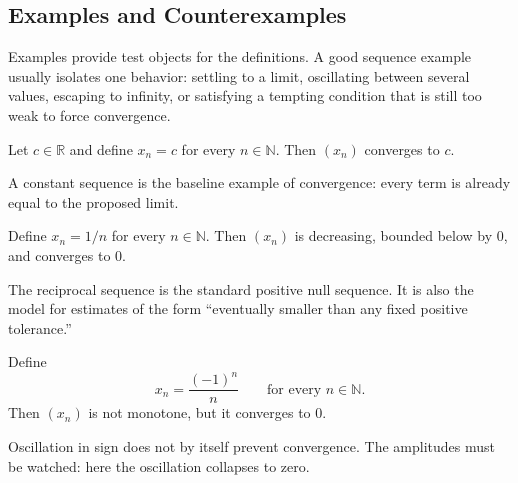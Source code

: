 \subsection*{Examples and Counterexamples}
\begin{exposition}
Examples provide test objects for the definitions. A good sequence example
usually isolates one behavior: settling to a limit, oscillating between
several values, escaping to infinity, or satisfying a tempting condition that
is still too weak to force convergence.
\end{exposition}

\begin{example*}
\label{ex:sequence-example-constant}
Let $c\in\mathbb{R}$ and define $x_n=c$ for every $n\in\mathbb{N}$. Then
$(x_n)$ converges to $c$.
\end{example*}

\begin{remark*}[Interpretation]
A constant sequence is the baseline example of convergence: every term is
already equal to the proposed limit.
\end{remark*}

\begin{example*}
\label{ex:sequence-example-reciprocal}
Define $x_n=1/n$ for every $n\in\mathbb{N}$. Then $(x_n)$ is decreasing,
bounded below by $0$, and converges to $0$.
\end{example*}

\begin{remark*}[Interpretation]
The reciprocal sequence is the standard positive null sequence. It is also
the model for estimates of the form ``eventually smaller than any fixed
positive tolerance.''
\end{remark*}

\begin{example*}
\label{ex:sequence-example-alternating-null}
Define
\[
  x_n=\frac{(-1)^n}{n}
  \qquad
  \text{for every } n\in\mathbb{N}.
\]
Then $(x_n)$ is not monotone, but it converges to $0$.
\end{example*}

\begin{remark*}[Interpretation]
Oscillation in sign does not by itself prevent convergence. The amplitudes
must be watched: here the oscillation collapses to zero.
\end{remark*}

